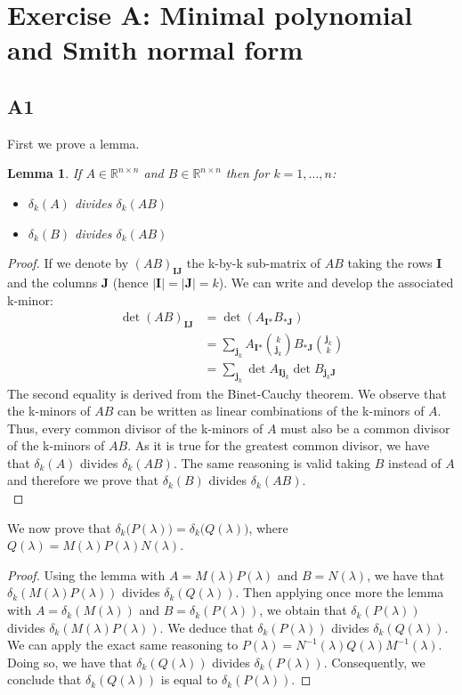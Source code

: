 \documentclass[11pt]{article}
\newtheorem*{lemma}{Lemma}
\newcommand{\real}{\mathbb{R}} %
\begin{document}
\section*{Exercise A: Minimal polynomial and Smith normal form}
\subsection*{A1}
First we prove a lemma.
\begin{lemma}
 If $A\in\real^{n\times n}$ and $B\in\real^{n\times n}$ then for $k=1,...,n$:
 \begin{itemize}
     \item $\delta_k(A)$ divides $\delta_k(AB)$
     \item $\delta_k(B)$ divides $\delta_k(AB)$
 \end{itemize}
\end{lemma}
\begin{proof}
If we denote by $(AB)_{\textbf{I}\textbf{J}}$ the k-by-k sub-matrix of $AB$ taking the rows $\textbf{I}$ and the columns $\textbf{J}$ (hence $|\textbf{I}|=|\textbf{J}|=k$). We can write and develop the associated k-minor:
\begin{align*}
    \det (AB)_{\textbf{I}\textbf{J}}&=\det(A_{\textbf{I}*}B_{*\textbf{J}})\\
    &=\sum_{\textbf{j}_k} A_{\textbf{I}*}\binom{k}{\textbf{j}_k}B_{*\textbf{J}}\binom{\textbf{j}_k}{k}\\
    &=\sum_{\textbf{j}_k} \det A_{\textbf{I} \textbf{j}_k} \det B_{\textbf{j}_k \textbf{J}}\ \
\end{align*}
The second equality is derived from the Binet-Cauchy theorem. We observe that the k-minors of $AB$ can be written as linear combinations of the k-minors of $A$. Thus, every common divisor of the k-minors of $A$ must also be a common divisor of the k-minors of $AB$. As it is true for the greatest common divisor, we have that $\delta_k(A)$ divides $\delta_k(AB)$. The same reasoning is valid taking $B$ instead of $A$ and therefore we prove that $\delta_k(B)$ divides $\delta_k(AB)$.\\
\end{proof}
We now prove that \(\delta_k\big(P(\lambda)\big) = \delta_k\big(Q(\lambda)\big)\), where \(Q(\lambda) = M(\lambda) P(\lambda) N(\lambda)\).

\begin{proof}
Using the lemma with $A=M(\lambda)P(\lambda)$ and $B=N(\lambda)$, we have that $\delta_k(M(\lambda)P(\lambda))$ divides $\delta_k(Q(\lambda))$. Then applying once more the lemma with $A=\delta_k(M(\lambda))$ and $B=\delta_k(P(\lambda))$, we obtain that $\delta_k(P(\lambda))$ divides $\delta_k(M(\lambda)P(\lambda))$. We deduce that $\delta_k(P(\lambda))$ divides $\delta_k(Q(\lambda))$.\\

We can apply the exact same reasoning to $P(\lambda)=N^{-1}(\lambda)Q(\lambda)M^{-1}(\lambda)$. Doing so, we have that $\delta_k(Q(\lambda))$ divides $\delta_k(P(\lambda))$. Consequently, we conclude that $\delta_k(Q(\lambda))$ is equal to $\delta_k(P(\lambda))$.
\end{proof}
\end{document}
